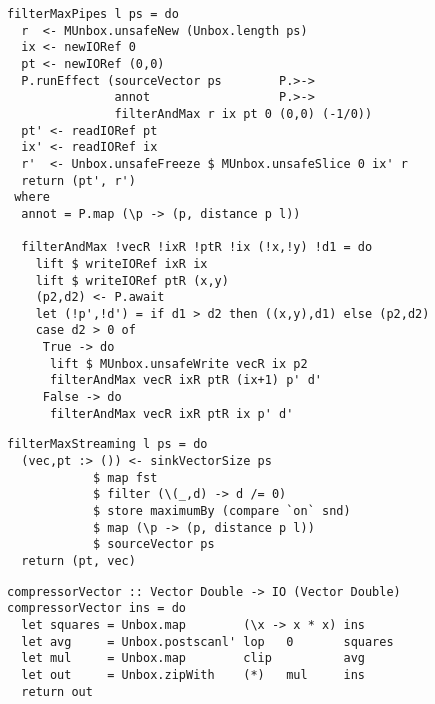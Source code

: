\begin{lstlisting}[float,label=l:a:bench:filterMaxPipes,caption=Pipes implementation of \Hs/filterMax/]
filterMaxPipes l ps = do
  r  <- MUnbox.unsafeNew (Unbox.length ps)
  ix <- newIORef 0
  pt <- newIORef (0,0)
  P.runEffect (sourceVector ps        P.>->
               annot                  P.>->
               filterAndMax r ix pt 0 (0,0) (-1/0))
  pt' <- readIORef pt
  ix' <- readIORef ix
  r'  <- Unbox.unsafeFreeze $ MUnbox.unsafeSlice 0 ix' r
  return (pt', r')
 where
  annot = P.map (\p -> (p, distance p l))

  filterAndMax !vecR !ixR !ptR !ix (!x,!y) !d1 = do
    lift $ writeIORef ixR ix
    lift $ writeIORef ptR (x,y)
    (p2,d2) <- P.await
    let (!p',!d') = if d1 > d2 then ((x,y),d1) else (p2,d2)
    case d2 > 0 of
     True -> do
      lift $ MUnbox.unsafeWrite vecR ix p2
      filterAndMax vecR ixR ptR (ix+1) p' d'
     False -> do
      filterAndMax vecR ixR ptR ix p' d'
\end{lstlisting}

\begin{lstlisting}[float,label=l:a:bench:filterMaxStreaming,caption=Streaming implementation of \Hs/filterMax/]
filterMaxStreaming l ps = do
  (vec,pt :> ()) <- sinkVectorSize ps
            $ map fst
            $ filter (\(_,d) -> d /= 0)
            $ store maximumBy (compare `on` snd)
            $ map (\p -> (p, distance p l))
            $ sourceVector ps
  return (pt, vec)
\end{lstlisting}

% 


\begin{lstlisting}[float,label=l:a:bench:compressorVector,caption=Vector implementation of \Hs/compressor/]
compressorVector :: Vector Double -> IO (Vector Double)
compressorVector ins = do
  let squares = Unbox.map        (\x -> x * x) ins
  let avg     = Unbox.postscanl' lop   0       squares
  let mul     = Unbox.map        clip          avg
  let out     = Unbox.zipWith    (*)   mul     ins
  return out
\end{lstlisting}

